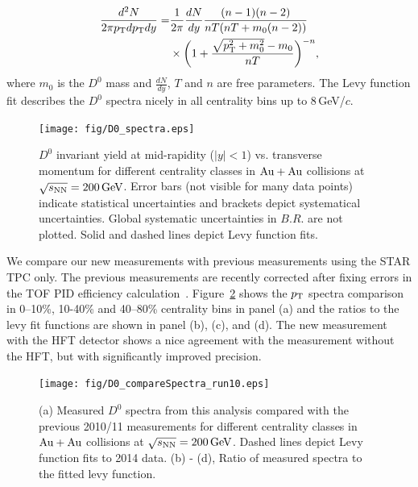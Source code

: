 \documentclass[%
 reprint,	
 amsmath,amssymb,
 aps,
 prc,
]{revtex4-1}
\begin{document}
\begin{equation}
  \begin{aligned}
    \frac{d^2N}{2\pi p_{\rm T}dp_{\rm T}dy} = 
   & \frac{1}{2\pi}\frac{dN}{dy}\frac{(n-1)(n-2)}{nT(nT+m_0(n-2))} \\
  & \times \bigg(1+\frac{\sqrt{p_{\rm T}^2+m_0^2}-m_0}{nT}\bigg)^{-n},
  \end{aligned}
\label{equ:equation4}
\end{equation}
where $m_0$ is the $D^0$ mass and $\frac{dN}{dy}$, $T$ and $n$ are free parameters. The Levy function fit describes the $D^0$ spectra nicely in all centrality bins up to 8\,GeV/$c$.


\begin{figure}
\centering
\texttt{[image: fig/D0\_spectra.eps]}
\caption{$D^{0}$ invariant yield at mid-rapidity ($|y|<1$) vs. transverse momentum for different centrality classes in ${\rm{Au + Au}}$ collisions at ${\sqrt{s_{\rm NN}} = \rm{200\,GeV}}$. Error bars (not visible for many data points) indicate statistical uncertainties and brackets depict systematical uncertainties. Global systematic uncertainties in $B.R.$ are not plotted. Solid and dashed lines depict Levy function fits.}
\label{fig:D0_spectra} 
\end{figure}


We compare our new measurements with previous measurements using the STAR TPC only. The previous measurements are recently corrected after fixing errors in the TOF PID efficiency calculation~\cite{Star_D_RAA,Star_D_RAA_corr}. Figure~\ref{fig:D0_compareSpectra_run10} shows the $p_{\rm T}$ spectra comparison in 0--10\%, 10-40\% and 40--80\% centrality bins in panel (a) and the ratios to the levy fit functions are shown in panel (b), (c), and (d). The new measurement with the HFT detector shows a nice agreement with the measurement without the HFT, but with significantly improved precision.

\begin{figure}
\centering
\texttt{[image: fig/D0\_compareSpectra\_run10.eps]}
  \caption{(a) Measured $D^{0}$ spectra from this analysis compared with the previous 2010/11 measurements for different centrality classes in ${\rm{Au + Au}}$ collisions at ${\sqrt{s_{\rm NN}} = \rm{200\,GeV}}$. Dashed lines depict Levy function fits to 2014 data. (b) - (d), Ratio of measured spectra to the fitted levy function.}
\label{fig:D0_compareSpectra_run10} 
\end{figure}
\end{document}
